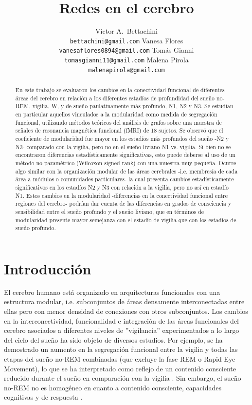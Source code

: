 \documentclass{article}
\title{Redes en el cerebro}
\author{
  Víctor A.~Bettachini\\
  \texttt{bettachini@gmail.com}
  \And Vanesa Flores\\
  \texttt{vanesaflores0894@gmail.com}
  \And Tomás Gianni\\
  \texttt{tomasgianni11@gmail.com}
  \And Malena Pirola\\
  \texttt{malenapirola@gmail.com}
}
\begin{document}
\maketitle


\begin{abstract}
En este trabajo se evaluaron los cambios en la conectividad funcional de diferentes áreas del cerebro en relación a los diferentes estadíos de profundidad del sueño no-REM, vigilia, W, y de sueño paulatinamente más profundo, N1, N2 y N3.
Se estudian en particular aquellos vinculados a la modularidad como medida de segregación funcional, utilizando métodos teóricos del análisis de grafos sobre una muestra de señales de resonancia magnética funcional (fMRI) de 18 sujetos. 
Se observó que el coeficiente de modularidad fue mayor en los estadíos más profundos del sueño -N2 y N3- comparado con la vigilia, pero no en el sueño liviano N1 vs. vigilia.
Si bien no se encontraron diferencias estadísticamente significativas, esto puede deberse al uso de un método no paramétrico (Wilcoxon signed-rank) con una muestra muy pequeña. 
Ocurre algo similar con la organización modular de las áreas cerebrales -i.e. membresía de cada área a módulos o comunidades particulares- la cual presenta cambios estadísticamente significativos en los estadíos N2 y N3 con relación a la vigilia, pero no así en estadío N1.
Estos cambios en la modularidad -diferencias en la conectividad funcional entre regiones del cerebro- podrían dar cuenta de las diferencias en grados de consciencia y sensibilidad entre el sueño profundo y el sueño liviano, que en términos de modularidad presente mayor semejanza con el estadío de vigilia que con los estadíos de sueño profundo.
\end{abstract}

    
\section{Introducción}

El cerebro humano está organizado en arquitecturas funcionales con una estructura modular, i.e. subconjuntos de áreas densamente interconectadas entre ellas pero con menor densidad de conexiones con otros subconjuntos.
Los cambios en la interconectividad, funcionalidad e integración de las áreas funcionales del cerebro asociados a diferentes niveles de ''vigilancia'' experimentados a lo largo del ciclo del sueño ha sido objeto de diversos estudios.
Por ejemplo, se ha demostrado un aumento en la segregación funcional entre la vigilia y todas las etapas del sueño no-REM combinadas (que excluye la fase REM o Rapid Eye Movement), lo que se ha interpretado como reflejo de un contenido consciente reducido durante el sueño en comparación con la vigilia \cite{boly2012hierarchical}.
Sin embargo, el sueño no-REM no es homogéneo en cuanto a contenido consciente, capacidades cognitivas y de respuesta \cite{berry2012aasm,schabus2012fate}.
\end{document}
